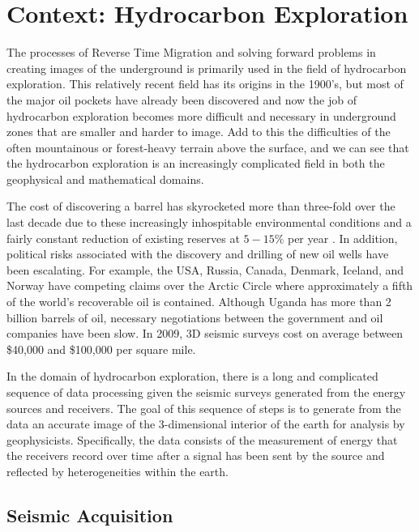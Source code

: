 \newpage
\section{Context: Hydrocarbon Exploration}

The processes of Reverse Time Migration and solving forward problems in creating images of the underground is primarily used in the field of hydrocarbon exploration. This relatively recent field has its origins in the 1900's, but most of the major oil pockets have already been discovered and now the job of hydrocarbon exploration becomes more difficult and necessary in underground zones that are smaller and harder to image. Add to this the difficulties of the often mountainous or forest-heavy terrain above the surface, and we can see that the hydrocarbon exploration is an increasingly complicated field in both the geophysical and mathematical domains. 

The cost of discovering a barrel has skyrocketed more than three-fold over the last decade due to these increasingly inhospitable environmental conditions and a fairly constant reduction of existing reserves at $5-15\%$ per year \cite{hydrocarbonExplorationCosts}. In addition, political risks associated with the discovery and drilling of new oil wells have been escalating. For example, the USA, Russia, Canada, Denmark, Iceland, and Norway have competing claims over the Arctic Circle where approximately a fifth of the world's recoverable oil is contained. Although Uganda has more than 2 billion barrels of oil, necessary negotiations between the government and oil companies have been slow. In 2009, 3D seismic surveys cost on average between \$40,000 and \$100,000 per square mile. \cite{hydrocarbonExplorationCosts}

In the domain of hydrocarbon exploration, there is a long and complicated sequence of data processing given the seismic surveys generated from the energy sources and receivers. The goal of this sequence of steps is to generate from the data an accurate image of the 3-dimensional interior of the earth for analysis by geophysicists. Specifically, the data consists of the measurement of energy that the receivers record over time after a signal has been sent by the source and reflected by heterogeneities within the earth.

\subsection{Seismic Acquisition}

